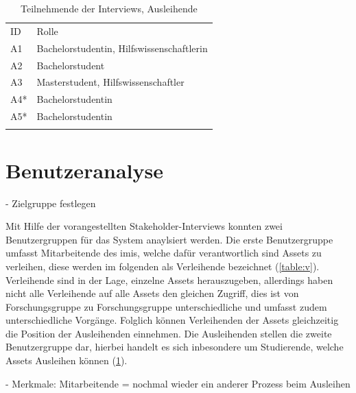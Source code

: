 \begin{table}[h]
        \centering
        \caption{Teilnehmende der Interviews, Ausleihende}
        \begin{tabular}{ll}
                \arrayrulecolor{maincolor}\hline
                \sffamily\color{maincolor}ID & \sffamily\color{maincolor}Rolle
                \\
                \arrayrulecolor{maincolor}\hline
                A1                           & Bachelorstudentin,
                Hilfswissenschaftlerin                                         \\
                A2                           & Bachelorstudent                 \\
                A3                           & Masterstudent,
                Hilfswissenschaftler                                           \\
                A4*                          & Bachelorstudentin               \\
                A5*                          & Bachelorstudentin               \\
                \arrayrulecolor{maincolor}\hline
        \end{tabular}
        \label{table:a}
        \hfill

\end{table}

\section{Benutzeranalyse}
\label{section:benutzer}
- Zielgruppe festlegen

Mit Hilfe der vorangestellten Stakeholder-Interviews konnten zwei
Benutzergruppen für das System anaylsiert werden. Die erste Benutzergruppe
umfasst Mitarbeitende des \ac{imis}, welche dafür verantwortlich sind Assets zu
verleihen, diese werden im folgenden als Verleihende bezeichnet (\ref{table:v}).
Verleihende sind in der Lage, einzelne Assets herauszugeben, allerdings haben
nicht alle Verleihende auf alle Assets den gleichen Zugriff, dies ist von
Forschungsgruppe zu Forschungsgruppe unterschiedliche und umfasst zudem
unterschiedliche Vorgänge. Folglich können Verleihenden der Assets gleichzeitig
die Position der Ausleihenden einnehmen. Die Ausleihenden stellen die zweite
Benutzergruppe dar, hierbei handelt es sich inbesondere um Studierende, welche
Assets Ausleihen können (\ref{table:a}).

- Merkmale: Mitarbeitende = nochmal wieder ein anderer Prozess beim Ausleihen

